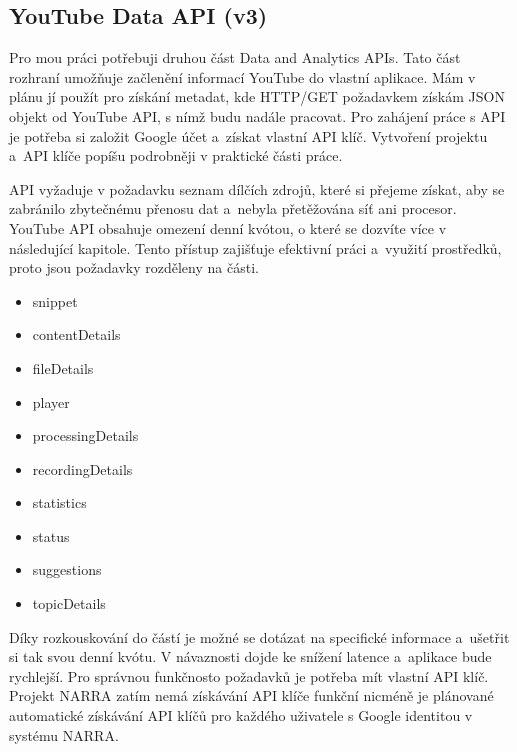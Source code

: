 \subsection{YouTube Data API (v3)}
\par Pro mou práci potřebuji druhou část Data and Analytics APIs\cite{apistart}\cite{apiv3}. Tato část rozhraní umožňuje začlenění informací YouTube do vlastní aplikace. Mám v plánu jí použít pro získání metadat, kde HTTP/GET požadavkem získám JSON objekt od YouTube API, s nímž budu nadále pracovat. Pro zahájení práce s API je potřeba si založit Google účet a~získat vlastní API klíč. Vytvoření projektu a~API klíče popíšu podrobněji v praktické části práce.
\par 
\par API vyžaduje v požadavku seznam dílčích zdrojů, které si přejeme získat, aby se zabránilo zbytečnému přenosu dat a~nebyla přetěžována síť ani procesor. YouTube API obsahuje omezení denní kvótou, o které se dozvíte více v následující kapitole. Tento přístup zajišťuje efektivní práci a~využití prostředků, proto jsou požadavky rozděleny na části.
\begin{itemize} 
\item{snippet}
\item{contentDetails}
\item{fileDetails}
\item{player}
\item{processingDetails}
\item{recordingDetails}
\item{statistics}
\item{status}
\item{suggestions}
\item{topicDetails}
\end{itemize}
\par Díky rozkouskování do částí je možné se dotázat na specifické informace a~ušetřit si tak svou denní kvótu. V návaznosti dojde ke snížení latence a~aplikace bude rychlejší. Pro správnou funkčnosto požadavků je potřeba mít vlastní API klíč. Projekt NARRA zatím nemá získávání API klíče funkční nicméně je plánované automatické získávání API klíčů pro každého uživatele s Google identitou v systému NARRA.


